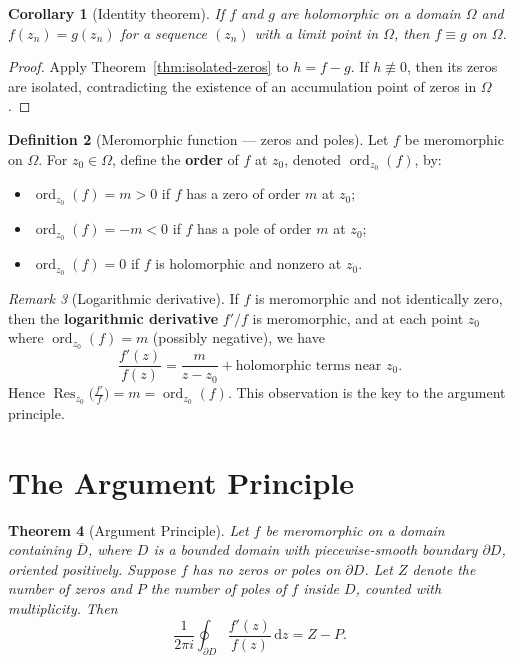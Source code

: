 \documentclass[12pt,a4paper,openany]{book}
\theoremstyle{definition}
\newtheorem{definition}{Definition}[chapter]
\theoremstyle{plain}
\newtheorem{theorem}[definition]{Theorem}
\newtheorem{corollary}[definition]{Corollary}
\theoremstyle{remark}
\newtheorem{remark}[definition]{Remark}
\DeclareMathOperator{\Res}{Res}
\newcommand{\dd}{\mathrm{d}}
\DeclareMathOperator{\ord}{ord}
\begin{document}
\begin{corollary}[Identity theorem]\label{cor:identity-thm}
If $f$ and $g$ are holomorphic on a domain $\Omega$ and
$f(z_n) = g(z_n)$ for a sequence $(z_n)$ with a limit point
in $\Omega$, then $f \equiv g$ on $\Omega$.
\end{corollary}

\begin{proof}
Apply Theorem~\ref{thm:isolated-zeros} to $h = f - g$. If
$h \not\equiv 0$, then its zeros are isolated, contradicting
the existence of an accumulation point of zeros in $\Omega$.
\end{proof}

\begin{definition}[Meromorphic function — zeros and poles]\label{def:zeros-poles-count}
Let $f$ be meromorphic on $\Omega$. For $z_0 \in \Omega$, define
the \textbf{order} of $f$ at $z_0$, denoted $\ord_{z_0}(f)$, by:
\begin{itemize}
  \item $\ord_{z_0}(f) = m > 0$ if $f$ has a zero of order $m$ at $z_0$;
  \item $\ord_{z_0}(f) = -m < 0$ if $f$ has a pole of order $m$ at $z_0$;
  \item $\ord_{z_0}(f) = 0$ if $f$ is holomorphic and nonzero at $z_0$.
\end{itemize}
\end{definition}

\begin{remark}[Logarithmic derivative]\label{rem:log-derivative}
If $f$ is meromorphic and not identically zero, then the
\textbf{logarithmic derivative} $f'/f$ is meromorphic, and at
each point $z_0$ where $\ord_{z_0}(f) = m$ (possibly negative), we have
\[
  \frac{f'(z)}{f(z)} = \frac{m}{z - z_0} + \text{holomorphic terms near } z_0.
\]
Hence $\Res_{z_0}\!\bigl(\frac{f'}{f}\bigr) = m = \ord_{z_0}(f)$.
This observation is the key to the argument principle.
\end{remark}


\section{The Argument Principle}\label{sec:argument-principle}

\begin{theorem}[Argument Principle]\label{thm:argument-principle}
Let $f$ be meromorphic on a domain containing $\overline{D}$, where
$D$ is a bounded domain with piecewise-smooth boundary $\partial D$,
oriented positively. Suppose $f$ has no zeros or poles on $\partial D$.
Let $Z$ denote the number of zeros and $P$ the number of poles of $f$
inside $D$, counted with multiplicity. Then
\begin{equation}\label{eq:argument-principle}
  \frac{1}{2\pi i} \oint_{\partial D} \frac{f'(z)}{f(z)} \, \dd z
  = Z - P.
\end{equation}
\end{theorem}
\end{document}
